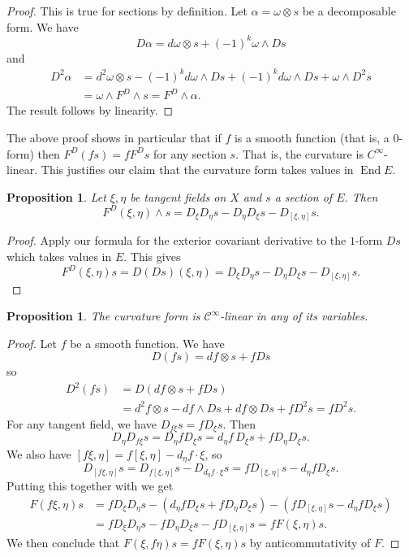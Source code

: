 \documentclass[11pt]{article}
\newtheorem{prop}[theo]{Proposition}
\newtheorem*{proof}{Proof}
\newcommand{\cc}[1]{\mathcal{#1}}
\DeclareMathOperator{\End}{End}
\begin{document}
\begin{proof}
This is true for sections by definition. Let $\alpha = \omega \otimes s$ be a decomposable form. We have
$$
D\alpha = d\omega \otimes s + (-1)^k \omega \wedge Ds
$$
and
\begin{align*}
D^2 \alpha
&= d^2 \omega \otimes s - (-1)^k d\omega \wedge Ds
+ (-1)^k d\omega \wedge Ds + \omega \wedge D^2 s
\\
&= \omega \wedge F^D \wedge s
= F^D \wedge \alpha.
\end{align*}
The result follows by linearity.
\end{proof}

The above proof shows in particular that if $f$ is a smooth function (that is, a $0$-form) then $F^D(f s) = f F^D s$ for any section $s$. That is, the curvature is $C^\infty$-linear. This justifies our claim that the curvature form takes values in $\End E$.


\begin{prop}
\label{prop:curvature-commutative}
Let $\xi, \eta$ be tangent fields on $X$ and $s$ a section of $E$. Then
$$
F^D(\xi, \eta) \wedge s
= D_\xi D_\eta s - D_\eta D_\xi s - D_{[\xi,\eta]} s.
$$
\end{prop}

\begin{proof}
Apply our formula for the exterior covariant derivative to the $1$-form $Ds$ which takes values in $E$. This gives
\[
F^D(\xi,\eta) s
= D(Ds)(\xi,\eta)
= D_\xi D_\eta s - D_\eta D_\xi s - D_{[\xi,\eta]} s.
\]
\end{proof}


\begin{prop}
The curvature form is $\cc C^\infty$-linear in any of its variables.
\end{prop}

\begin{proof}
Let $f$ be a smooth function. We have
$$
D(fs) = df \otimes s + f Ds
$$
so
\begin{align*}
D^2(fs)
&= D(df \otimes s + f Ds)
\\
&= d^2f \otimes s - df \wedge Ds + df \otimes Ds + f D^2 s
= f D^2 s.
\end{align*}
For any tangent field, we have $D_{f\xi}s = f D_\xi s$. Then
$$
D_\eta D_{f \xi} s
= D_\eta f D_\xi s
= d_\eta f \, D_\xi s + f D_\eta D_\xi s.
$$
We also have $[f\xi, \eta] = f[\xi,\eta] - d_\eta f \cdot \xi$, so
$$
D_{[f\xi,\eta]}s
= D_{f[\xi,\eta]}s - D_{d_\eta f \cdot \xi} s
= f D_{[\xi,\eta]} s - d_\eta f D_\xi s.
$$
Putting this together with  we get
\begin{align*}
F(f \xi, \eta) s
&= f D_\xi D_\eta s - (d_\eta f D_\xi s + f D_\eta D_\xi s) - (f D_{[\xi,\eta]} s - d_\eta f D_\xi s)
\\
&= f D_\xi D_\eta s - f D_\eta D_\xi s - f D_{[\xi,\eta]} s
= f F(\xi, \eta) s.
\end{align*}
We then conclude that $F(\xi,f \eta)s = f F(\xi,\eta) s$ by anticommutativity of $F$.
\end{proof}
\end{document}

